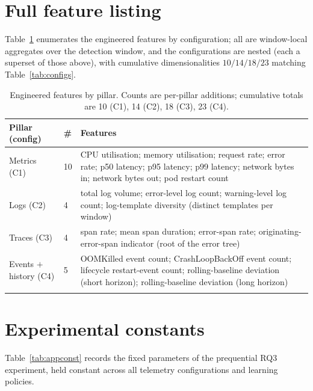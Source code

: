\documentclass[pdflatex,sn-mathphys-num]{sn-jnl}%
\theoremstyle{thmstyleone}%
\theoremstyle{thmstyletwo}%
\theoremstyle{thmstylethree}%
\begin{document}
\begin{appendices}

\section{Full feature listing}\label{app:features}

Table~\ref{tab:appfeatures} enumerates the engineered features by configuration; all are window-local aggregates over the detection window, and the configurations are nested (each a superset of those above), with cumulative dimensionalities $10/14/18/23$ matching Table~\ref{tab:configs}.

\begin{table}[ht]
\caption{Engineered features by pillar. Counts are per-pillar additions; cumulative totals are 10 (C1), 14 (C2), 18 (C3), 23 (C4).}\label{tab:appfeatures}
\begin{tabular}{@{}llp{}@{}}
\toprule
Pillar (config) & \# & Features \\
\midrule
Metrics (C1) & 10 & CPU utilisation; memory utilisation; request rate; error rate; p50 latency; p95 latency; p99 latency; network bytes in; network bytes out; pod restart count \\
Logs (C2)    & 4  & total log volume; error-level log count; warning-level log count; log-template diversity (distinct templates per window) \\
Traces (C3)  & 4  & span rate; mean span duration; error-span rate; originating-error-span indicator (root of the error tree) \\
Events ${+}$ history (C4) & 5 & OOMKilled event count; CrashLoopBackOff event count; lifecycle restart-event count; rolling-baseline deviation (short horizon); rolling-baseline deviation (long horizon) \\
\botrule
\end{tabular}
\end{table}
\FloatBarrier

\section{Experimental constants}\label{app:constants}
\setcounter{table}{0}

Table~\ref{tab:appconst} records the fixed parameters of the prequential RQ3 experiment, held constant across all telemetry configurations and learning policies.


\end{appendices}
\end{document}
